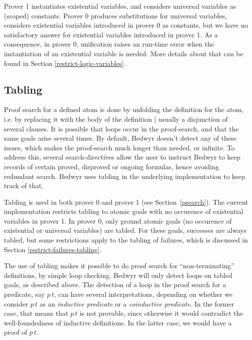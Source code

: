 \documentclass{article}
\begin{document}
Prover 1 instantiates existential variables, and considers universal variables 
as (scoped) constants. Prover 0 produces substitutions for universal variables,
considers existential variables introduced in prover 0 as constants,
but we have no satisfactory answer for existential variables introduced in 
prover 1.
As a consequence, in prover 0, unification raises an run-time error
when the instantiation of an existential variable is needed.
More details about that can be found in Section \ref{restrict-logic-variables}.

\subsection{Tabling}
\label{tabling}

Proof search for a defined atom is done by unfolding the definition 
for the atom, i.e. by replacing it with the body of the definition |
usually a disjunction of several clauses.
It is possible that loops occur in the proof-search,
and that the same goals arise several times.
By default, Bedwyr doesn't detect any of these issues, which makes the 
proof-search much longer than needed, or infinite.
To address this, several search-directives
allow the user to instruct Bedwyr to keep records of certain
proved, disproved or ongoing formulas,
hence avoiding redundant search.
Bedwyr uses tabling in the underlying implementation to keep track of that.

Tabling is used in both prover 0 and prover 1 (see Section~\ref{psearch}).
The current implementation restricts tabling to atomic goals
with no occurence of existential variables in prover 1.
In prover 0, only ground atomic goals (no occurence of existential or universal 
variables) are tabled.
For these goals, successes are always tabled, but some restrictions apply
to the tabling of failures, which is discussed in Section 
\ref{restrict-failures-tabling}.

The use of tabling makes it possible to do proof search for
``non-terminating'' definitions, by simple loop checking.
Bedwyr will only detect loops on tabled goals, as described above.
The detection of a loop in the proof search for a predicate, say
$p\,t$, can have several interpretations, depending on whether
we consider $p\,t$ as an {\em inductive predicate} or
a {\em coinductive predicate}. In the former case, that means that
$p\,t$ is not provable, since otherwise it would contradict
the well-foundedness of inductive definitions. In the latter case,
we would have a proof of $p\,t$.
\end{document}
